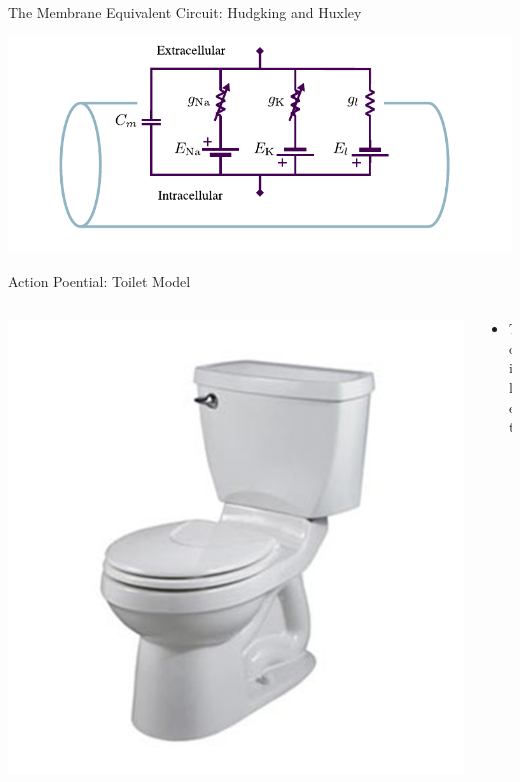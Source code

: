 \documentclass[aspectratio=169]{beamer}
\begin{document}
\begin{frame}{The Membrane Equivalent Circuit: Hudgking and Huxley}
    \begin{center}
        \includegraphics[width=\textwidth]{images/compartment.pdf}
    \end{center}
\end{frame}

\begin{frame}{Action Poential: Toilet Model}
    \begin{columns}
        \begin{column}{0.28\textwidth}
            \begin{center}
                \includegraphics[width=\textwidth]{images/toilet.jpg}
            \end{center}
        \end{column}
        \begin{column}{0.68\textwidth}
            \begin{itemize}
                \item Toilet
            \end{itemize}
        \end{column}
    \end{columns}
\end{frame}
\end{document}
